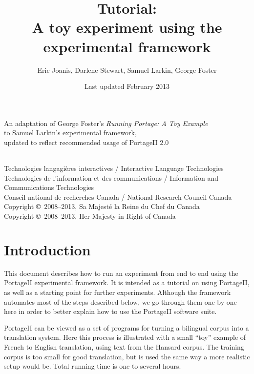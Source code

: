 \documentclass[11pt,letterpaper]{article}
\title{\PS Tutorial: \\
       A toy experiment using the \\
       experimental framework}
\date{Last updated February 2013}
\author{Eric Joanis, Darlene Stewart, Samuel Larkin, George Foster}
\newcommand{\PS}{PortageII\xspace}
\begin{document}
\vfill

\maketitle

\vfill

\begin{center}
An adaptation of George Foster's \emph{Running Portage: A Toy Example} \\
to Samuel Larkin's experimental framework,\\
updated to reflect recommended usage of PortageII 2.0
\end{center}

\vfill
\vfill

\begin{center}
{~} \\ \footnotesize
   Technologies langagi{\`e}res interactives /
      Interactive Language Technologies \\
   Technologies de l'information et des communications /
      Information and Communications Technologies \\
   Conseil national de recherches Canada /
      National Research Council Canada \\
   Copyright \copyright\ 2008--2013, Sa Majest{\'e} la Reine du Chef du Canada
   \\ Copyright \copyright\ 2008--2013, Her Majesty in Right of Canada
\end{center}

\vfill

\newpage


\tableofcontents


\newpage


\section{Introduction}

This document describes how to run an experiment from end to end using the \PS
experimental framework. It is intended as a tutorial on using \PS, as well as a
starting point for further experiments.  Although the framework automates most
of the steps described below, we go through them one by one here in order to
better explain how to use the \PS software suite.

\PS can be viewed as a set of programs for turning a bilingual corpus into a
translation system. Here this process is illustrated with a small ``toy''
example of French to English translation, using text from the Hansard corpus.
The training corpus is too small for good translation, but is used the same way
a more realistic setup would be. Total running time is one to several hours.
\end{document}
